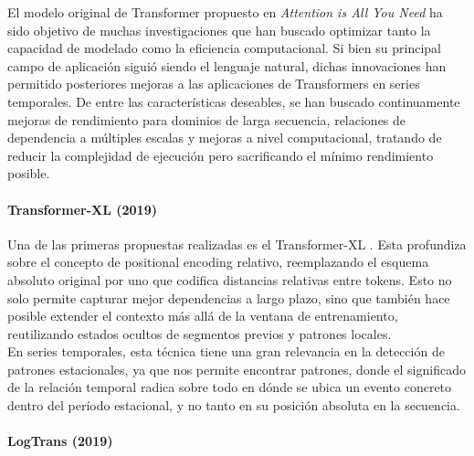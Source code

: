 El modelo original de Transformer propuesto en \textit{Attention is All You Need} \cite{vaswani2023attentionneed} ha sido objetivo de muchas investigaciones que han buscado optimizar tanto la capacidad de modelado como la eficiencia computacional. Si bien su principal campo de aplicación siguió siendo el lenguaje natural, dichas innovaciones han permitido posteriores mejoras a las aplicaciones de Transformers en series temporales. De entre las características deseables, se han buscado continuamente mejoras de rendimiento para dominios de larga secuencia, relaciones de dependencia a múltiples escalas y mejoras a nivel computacional, tratando de reducir la complejidad de ejecución pero sacrificando el mínimo rendimiento posible.

\paragraph{Transformer-XL (2019)}


Una de las primeras propuestas realizadas es el Transformer-XL \cite{dai2019transformerxlattentivelanguagemodels}. Esta profundiza sobre el concepto de positional encoding relativo, reemplazando el esquema absoluto original por uno que codifica distancias relativas entre tokens. Esto no solo permite capturar mejor dependencias a largo plazo, sino que también hace posible extender el contexto más allá de la ventana de entrenamiento, reutilizando estados ocultos de segmentos previos y patrones locales.\\

En series temporales, esta técnica tiene una gran relevancia en la detección de patrones estacionales, ya que nos permite encontrar patrones, donde el significado de la relación temporal radica sobre todo en dónde se ubica un evento concreto dentro del período estacional, y no tanto en su posición absoluta en la secuencia.


\paragraph{LogTrans (2019)}

